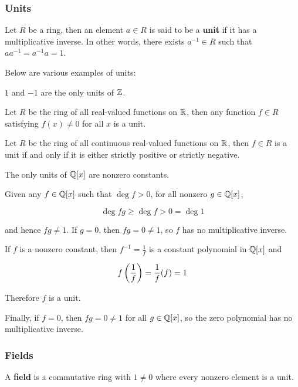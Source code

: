 \documentclass[a4paper,12pt]{article}
\begin{document}
\subsubsection{Units}
\begin{dft}
  Let $R$ be a ring, then an element $a\in R$ is said to be a \textbf{unit} if it has a multiplicative inverse. In other words, there exists $a^{-1}\in R$ such that $aa^{-1}=a^{-1}a=1$.
\end{dft}\n

\begin{exm}
  Below are various examples of units:

  \begin{alist}
    \item $1$ and $-1$ are the only units of $\mathbb{Z}$.
    \item Let $R$ be the ring of all real-valued functions on $\mathbb{R}$, then any function $f\in R$ satisfying $f(x)\neq 0$ for all $x$ is a unit.
    \item Let $R$ be the ring of all continuous real-valued functions on $\mathbb{R}$, then $f\in R$ is a unit if and only if it is either strictly positive or strictly negative.
  \end{alist}
\end{exm}\n

\begin{pst}
  The only units of $\mathbb{Q}[x]$ are nonzero constants.\n

  \prf Given any $f\in\mathbb{Q}[x]$ such that $\deg f>0$, for all nonzero $g\in\mathbb{Q}[x]$,

  $$\deg fg\geq\deg f>0=\deg 1$$\s

  and hence $fg\neq 1$. If $g=0$, then $fg=0\neq 1$, so $f$ has no multiplicative inverse.\n

  If $f$ is a nonzero constant, then $f^{-1}=\frac{1}{f}$ is a constant polynomial in $\mathbb{Q}[x]$ and

  $$f\left( \frac{1}{f}\right)=\frac{1}{f}(f)=1$$\s

  Therefore $f$ is a unit.\n

  Finally, if $f=0$, then $fg=0\neq 1$ for all $g\in\mathbb{Q}[x]$, so the zero polynomial has no multiplicative inverse.
\end{pst}

\propdisp

\subsubsection{Fields}
\begin{dft}
  A \textbf{field} is a commutative ring with $1\neq 0$ where every nonzero element is a unit.
\end{dft}\n
\end{document}
